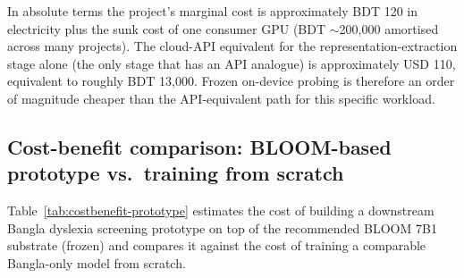 In absolute terms the project's marginal cost is approximately BDT 120 in electricity plus the sunk cost of one consumer GPU (BDT $\sim$200{,}000 amortised across many projects). The cloud-API equivalent for the representation-extraction stage alone (the only stage that has an API analogue) is approximately USD 110, equivalent to roughly BDT 13{,}000. Frozen on-device probing is therefore an order of magnitude cheaper than the API-equivalent path for this specific workload.

\subsection*{Cost-benefit comparison: BLOOM-based prototype vs.\ training from scratch}

Table~\ref{tab:costbenefit-prototype} estimates the cost of building a downstream Bangla dyslexia screening prototype on top of the recommended BLOOM 7B1 substrate (frozen) and compares it against the cost of training a comparable Bangla-only model from scratch.

\begin{table}[H]
\centering
\caption{Cost-benefit comparison: BLOOM-based frozen prototype vs.\ training a comparable Bangla-only model from scratch. All numbers are order-of-magnitude estimates intended for project-planning use.}
\label{tab:costbenefit-prototype}
\small
{}
\end{table}

